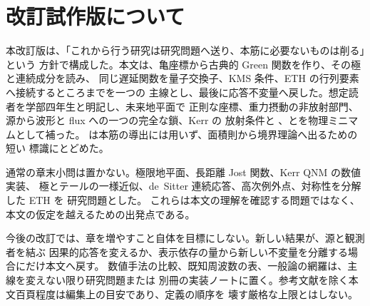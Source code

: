 \chapter*{改訂試作版について}

本改訂版は、「これから行う研究は研究問題へ送り、本筋に必要ないものは削る」という
方針で構成した。本文は、亀座標から古典的 Green 関数を作り、その極と連続成分を読み、
同じ遅延関数を量子交換子、KMS 条件、ETH の行列要素へ接続するところまでを一つの
主線とし、最後に応答不変量へ戻した。想定読者を学部四年生と明記し、未来地平面で
正則な座標、重力摂動の非放射部門、源から波形と flux への一つの完全な鎖、Kerr の
放射条件と 、とを物理ミニマムとして補った。
は本筋の導出には用いず、面積則から境界理論へ出るための短い
標識にとどめた。

通常の章末小問は置かない。極限地平面、長距離 Jost 関数、Kerr QNM の数値実装、
極とテールの一様近似、de~Sitter 連続応答、高次例外点、対称性を分解した ETH を
研究問題とした。
これらは本文の理解を確認する問題ではなく、本文の仮定を越えるための出発点である。

今後の改訂では、章を増やすこと自体を目標にしない。新しい結果が、源と観測者を結ぶ
因果的応答を変えるか、表示依存の量から新しい不変量を分離する場合にだけ本文へ戻す。
数値手法の比較、既知周波数の表、一般論の網羅は、主線を変えない限り研究問題または
別冊の実装ノートに置く。参考文献を除く本文百頁程度は編集上の目安であり、定義の順序を
壊す厳格な上限とはしない。
